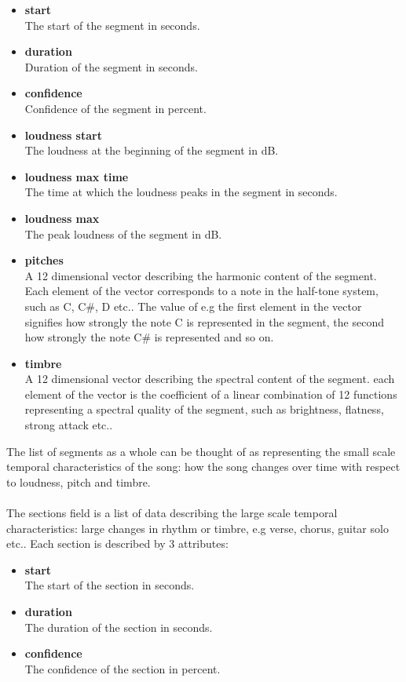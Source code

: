 \begin{itemize}
	\item \textbf{start} \\The start of the segment in seconds.
	\item \textbf{duration} \\Duration of the segment in seconds.
	\item \textbf{confidence} \\Confidence of the segment in percent.
	\item \textbf{loudness start} \\The loudness at the beginning of the segment in dB.
	\item \textbf{loudness max time} \\The time at which the loudness peaks in the segment in seconds.
	\item \textbf{loudness max} \\The peak loudness of the segment in dB.
	\item \textbf{pitches} \\A 12 dimensional vector describing the harmonic content of the segment. Each element of the vector corresponds to a note in the half-tone system, such as C, C\#, D etc.. The value of e.g the first element in the vector signifies how strongly the note C is represented in the segment, the second how strongly the note C\# is represented and so on.
	\item \textbf{timbre} \\A 12 dimensional vector describing the spectral content of the segment. each element of the vector is the coefficient of a linear combination of 12 functions representing a spectral quality of the segment, such as brightness, flatness, strong attack etc..
\end{itemize}
\noindent The list of segments as a whole can be thought of as representing the small scale temporal characteristics of the song: how the song changes over time with respect to loudness, pitch and timbre.
\\\\
The sections field is a list of data describing the large scale temporal characteristics: large changes in rhythm or timbre, e.g verse, chorus, guitar solo etc.. Each section is described by 3 attributes:
\begin{itemize}
	\item \textbf{start} \\The start of the section in seconds.
	\item \textbf{duration} \\The duration of the section in seconds.
	\item \textbf{confidence} \\The confidence of the section in percent.
\end{itemize}

